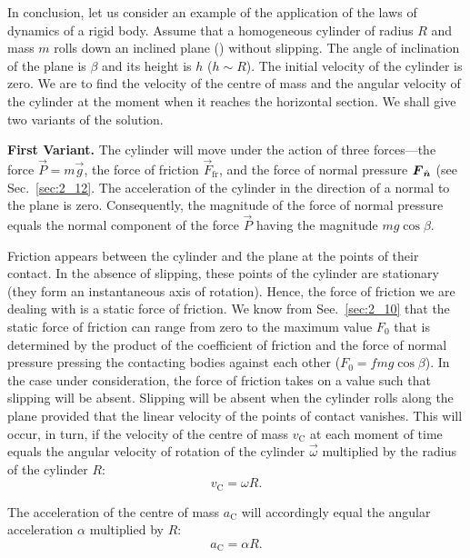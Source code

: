 In conclusion, let us consider an example of the application of the laws of dynamics of a rigid body. Assume that a homogeneous cylinder of radius $R$ and mass $m$ rolls down an inclined plane () without slipping. The angle of inclination of the plane is $\beta$ and its height is $h$ ($h\sim R$). The initial velocity of the cylinder is zero. We are to find the velocity of the centre of mass and the angular velocity of the cylinder at the moment when it reaches the horizontal section. We shall give two variants of the solution.

\textbf{First Variant.} The cylinder will move under the action of three forces---the force $\vec{P}=m\vec{g}$, the force of friction $\vec{F}_{\text{fr}}$, and the force of normal pressure $\boldsymbol{F}_{\hat{\boldsymbol{n}}}$ (see Sec.~\ref{sec:2_12}. The acceleration of the cylinder in the direction of a normal to the plane is zero. Consequently, the magnitude of the force of normal pressure equals the normal component of the force $\vec{P}$ having the magnitude $mg\cos\beta$.

Friction appears between the cylinder and the plane at the points of their contact. In the absence of slipping, these points of the cylinder are stationary (they form an instantaneous axis of rotation). Hence, the force of friction we are dealing with is a static force of friction. We know from See.~\ref{sec:2_10} that the static force of friction can range from zero to the maximum value $F_0$ that is determined by the product of the coefficient of friction and the force of normal pressure pressing the contacting bodies against each other ($F_0=fmg\cos\beta$). In the case under consideration, the force of friction takes on a value such that slipping will be absent. Slipping will be absent when the cylinder rolls along the plane provided that the linear velocity of the points of contact vanishes. This will occur, in turn, if the velocity of the centre of mass $v_{\text{C}}$ at each moment of time equals the angular velocity of rotation of the cylinder $\vec{\omega}$ multiplied by the radius of the cylinder $R$:
\begin{equation}\label{eq:5_61}
	v_{\text{C}} = \omega R.
\end{equation}

\noindent
The acceleration of the centre of mass $a_{\text{C}}$ will accordingly equal the angular acceleration $\alpha$ multiplied by $R$:
\begin{equation}\label{eq:5_62}
	a_{\text{C}} = \alpha R.
\end{equation}

